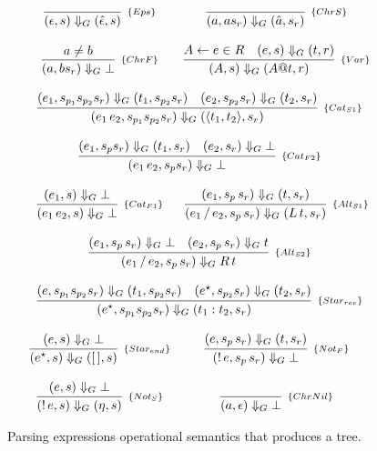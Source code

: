 \begin{figure}[H]
   \[
      \begin{array}{cc}
         \infer[_{\{Eps\}}]{(\epsilon,s) \Downarrow_G (\hat{\epsilon},s)}{} &
         \infer[_{\{ChrS\}}]{(a,as_r) \Downarrow_G (\hat{a},s_r)}{} \\ \\
         \infer[_{\{ChrF\}}]{(a,bs_r) \Downarrow_G \bot}{a \neq b} &
         \infer[_{\{Var\}}]{(A,s) \Downarrow_G (A@t, r)}
                        {A \leftarrow e \in R & (e,s) \Downarrow_G (t,r)} \\ \\
         \multicolumn{2}{c}{
            \infer[_{\{Cat_{S1}\}}]{(e_1\,e_2,s_{p_1}s_{p_2}s_r) \Downarrow_G (\langle t_1,t_2 \rangle, s_r)}
                                 {(e_1,s_{p_1}s_{p_2}s_r) \Downarrow_G (t_1,s_{p_2}s_r) &
                                 (e_2,s_{p_2}s_r)\Downarrow_G (t_2,s_r)}
         } \\ \\
         \multicolumn{2}{c}{
            \infer[_{\{Cat_{F2}\}}]{(e_1\,e_2,s_ps_r) \Downarrow_G \bot}
                                 { (e_1,s_ps_r) \Downarrow_G (t_1,s_r) &
                                    (e_2,s_r) \Downarrow_G \bot}} \\ \\
         \infer[_{\{Cat_{F1}\}}]{(e_1\,e_2,s)\Downarrow_G \bot}{(e_1,s) \Downarrow_G \bot} &
         \infer[_{\{Alt_{S1}\}}]{(e_1\,/\,e_2,s_p\,s_r) \Downarrow_G (L \, t,s_r)}
                                {(e_1,s_p\,s_r)\Downarrow_G (t,s_r)} \\ \\
         \multicolumn{2}{c}{
            \infer[_{\{Alt_{S2}\}}]{(e_1\,/\,e_2,s_p\,s_r) \Downarrow_G R \, t}
                                  {(e_1,s_p\,s_r)\Downarrow_G \bot &
                                   (e_2,s_p\,s_r)\Downarrow_G t}
         } \\ \\
         \multicolumn{2}{c}{
            \infer[_{\{Star_{rec}\}}]{(e^\star,s_{p_1}s_{p_2}s_r) \Downarrow_G (t_1 : t_2,s_r)}
                                 {(e,s_{p_1}s_{p_2}s_r) \Downarrow_G (t_1,s_{p_2}s_r) &
                                  (e^\star, s_{p_2}s_r) \Downarrow_G (t_2,s_r)}
         } \\ \\
         \infer[_{\{Star_{end}\}}]{(e^\star,s) \Downarrow_G ([\,],s)}
                                    {(e,s) \Downarrow_G \bot} &
         \infer[_{\{Not_F\}}]{(!\,e,s_p\,s_r) \Downarrow_G \bot}
                          {(e,s_p\,s_r) \Downarrow_G (t,s_r)}\\ \\
         \infer[_{\{Not_S\}}]{(!\,e,s) \Downarrow_G (\eta,s)}
         {(e,s) \Downarrow_G \bot}
           &
         \infer[_{\{ChrNil\}}]{(a,\epsilon) \Downarrow_G \bot}{}
      \end{array}
   \]
   \centering
   \caption{Parsing expressions operational semantics that produces a tree.}
   \label{fig:peg-tree-semantics}
\end{figure}

